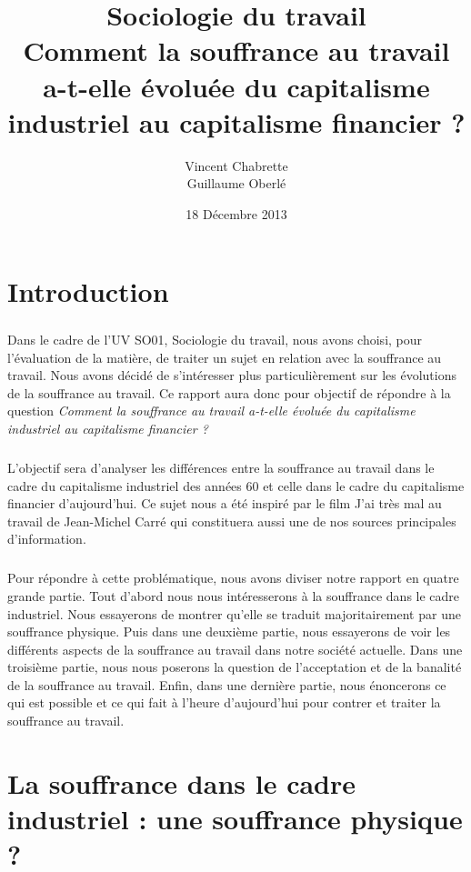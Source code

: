 \documentclass{report}
\title{Sociologie du travail\\Comment la souffrance au travail a-t-elle évoluée du capitalisme industriel au capitalisme financier ?}
\author{Vincent Chabrette\\Guillaume Oberlé}
\date{18 Décembre 2013}
\begin{document}

\maketitle
\tableofcontents

\chapter*{Introduction}
	\paragraph{}
		Dans le cadre de l'UV SO01, Sociologie du travail, nous avons choisi, pour l'évaluation de la matière, de traiter un sujet en relation avec la souffrance au travail. Nous avons décidé de s'intéresser plus particulièrement sur les évolutions de la souffrance au travail. Ce rapport aura donc pour objectif de répondre à la question \textit{Comment la souffrance au travail a-t-elle évoluée du capitalisme industriel au capitalisme financier ?}

	\paragraph{}
		L’objectif sera d’analyser les différences entre la souffrance au travail dans le cadre du capitalisme industriel des années 60 et celle dans le cadre du capitalisme financier d’aujourd’hui. Ce sujet nous a été inspiré par le film J’ai très mal au travail de Jean-Michel Carré qui constituera aussi une de nos sources principales d’information.

	\paragraph{}
		Pour répondre à cette problématique, nous avons diviser notre rapport en quatre grande partie. Tout d'abord nous nous intéresserons à la souffrance dans le cadre industriel. Nous essayerons de montrer qu'elle se traduit majoritairement par une souffrance physique. Puis dans une deuxième partie, nous essayerons de voir les différents aspects de la souffrance au travail dans notre société actuelle. Dans une troisième partie, nous nous poserons la question de l'acceptation et de la banalité de la souffrance au travail. Enfin, dans une dernière partie, nous énoncerons ce qui est possible et ce qui fait à l'heure d'aujourd'hui pour contrer et traiter la souffrance au travail.

\chapter{La souffrance dans le cadre industriel : une souffrance physique ?}
\end{document}

